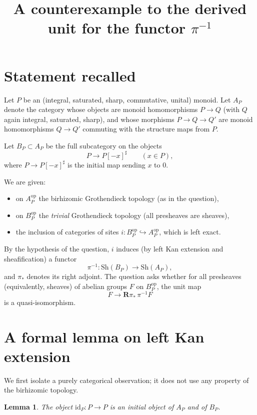 \documentclass[11pt]{article}
\newtheorem{lemma}[theorem]{Lemma}
\theoremstyle{remark}
\begin{document}
\title{A counterexample to the derived unit for the functor $\pi^{-1}$}
\author{}
\date{}
\maketitle

\section{Statement recalled}

Let $P$ be an (integral, saturated, sharp, commutative, unital) monoid.
Let $A_P$ denote the category whose objects are monoid homomorphisms $P\to Q$
(with $Q$ again integral, saturated, sharp), and whose morphisms $P\to Q \to Q'$
are monoid homomorphisms $Q\to Q'$ commuting with the structure maps from $P$.

Let $B_P\subset A_P$ be the full subcategory on the objects
\[
P \longrightarrow P[-x]^\sharp\qquad (x\in P),
\]
where $P\to P[-x]^\sharp$ is the initial map sending $x$ to $0$.

We are given:
\begin{itemize}
\item on $A_P^{\mathrm{op}}$ the birhizomic Grothendieck topology (as in the question),
\item on $B_P^{\mathrm{op}}$ the \emph{trivial} Grothendieck topology (all presheaves are sheaves),
\item the inclusion of categories of sites $i\colon B_P^{\mathrm{op}}\hookrightarrow A_P^{\mathrm{op}}$,
which is left exact.
\end{itemize}

By the hypothesis of the question, $i$ induces (by left Kan extension and sheafification)
a functor
\[
\pi^{-1}\colon \mathrm{Sh}(B_P)\longrightarrow \mathrm{Sh}(A_P),
\]
and $\pi_*$ denotes its right adjoint.
The question asks whether for all presheaves (equivalently, sheaves) of abelian groups
$F$ on $B_P^{\mathrm{op}}$, the unit map
\[
F \longrightarrow \mathbf{R}\pi_*\,\pi^{-1}F
\]
is a quasi-isomorphism.

\section{A formal lemma on left Kan extension}

We first isolate a purely categorical observation; it does not use any property of the
birhizomic topology.

\begin{lemma}\label{lem:initial-object}
The object $\mathrm{id}_P\colon P\to P$ is an initial object of $A_P$ and of $B_P$.
\end{lemma}
\end{document}
